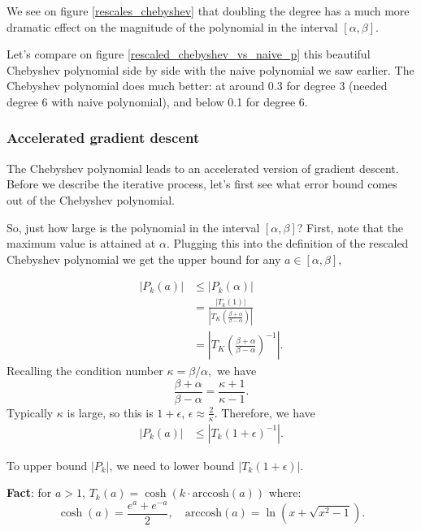 We see on figure \ref{rescales_chebyshev} that doubling the degree has a much more dramatic effect on the magnitude of the polynomial in the interval $[\alpha, \beta].$

Let's compare on figure \ref{rescaled_chebyshev_vs_naive_p} this beautiful Chebyshev polynomial side by side with the naive polynomial we saw earlier. The Chebyshev polynomial does much better: at around 0.3 for degree 3 (needed degree 6 with naive polynomial), and below 0.1 for degree 6.



\subsubsection{Accelerated gradient descent}

The Chebyshev polynomial leads to an accelerated version of gradient descent. Before we describe the iterative process, let's first see what error bound comes out of the Chebyshev polynomial.

So, just how large is the polynomial in the interval $[\alpha, \beta]$? First, note that the maximum value is attained at $\alpha$. Plugging this into the definition of the rescaled Chebyshev polynomial we get the upper bound for any $a\in[\alpha, \beta],$

\begin{align*}
|P_k(a)| &\leq |P_k(\alpha)| \\
&= \frac{|T_k(1)|}{|T_K\left(\frac{\beta + \alpha}{\beta - \alpha}\right)|} \\
&= {|T_K\left(\frac{\beta + \alpha}{\beta - \alpha}\right)^{-1}|}.
\end{align*}
Recalling the condition number $\kappa=\beta/\alpha,$ we have
\begin{equation*}
\frac{\beta + \alpha}{\beta - \alpha} = \frac{\kappa + 1}{\kappa - 1}.
\end{equation*}
Typically $\kappa$ is large, so this is $1 + \epsilon$, $\epsilon \approx \frac{2}{\kappa}$. Therefore, we have
\begin{eqnarray*}
|P_k(a)| &\leq {|T_k(1 + \epsilon)^{-1}|}.
\end{eqnarray*}

To upper bound $|P_k|$, we need to lower bound $|T_k(1 + \epsilon)|$.

\textbf{Fact}: for $a > 1$, $T_k(a) = \cosh\left(k \cdot \mathrm{arccosh} (a)\right)$ where:
\begin{equation*}
\cosh(a) = \frac{e^a + e^{-a}}{2},\quad \mathrm{arccosh}(a) = \ln\left(x + \sqrt{x^2 - 1}\right).
\end{equation*}

